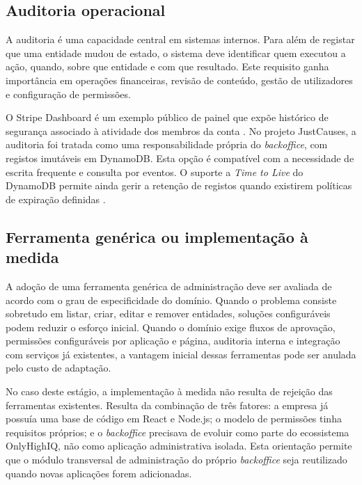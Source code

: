 \subsection{Auditoria operacional}

A auditoria é uma capacidade central em sistemas internos. Para além de registar que uma entidade mudou de estado, o sistema deve identificar quem executou a ação, quando, sobre que entidade e com que resultado. Este requisito ganha importância em operações financeiras, revisão de conteúdo, gestão de utilizadores e configuração de permissões.

O Stripe Dashboard é um exemplo público de painel que expõe histórico de segurança associado à atividade dos membros da conta \cite{StripeTeams}. No projeto JustCauses, a auditoria foi tratada como uma responsabilidade própria do \textit{backoffice}, com registos imutáveis em DynamoDB. Esta opção é compatível com a necessidade de escrita frequente e consulta por eventos. O suporte a \textit{Time to Live} do DynamoDB permite ainda gerir a retenção de registos quando existirem políticas de expiração definidas \cite{DynamoDBTTL}.

\subsection{Ferramenta genérica ou implementação à medida}

A adoção de uma ferramenta genérica de administração deve ser avaliada de acordo com o grau de especificidade do domínio. Quando o problema consiste sobretudo em listar, criar, editar e remover entidades, soluções configuráveis podem reduzir o esforço inicial. Quando o domínio exige fluxos de aprovação, permissões configuráveis por aplicação e página, auditoria interna e integração com serviços já existentes, a vantagem inicial dessas ferramentas pode ser anulada pelo custo de adaptação.

No caso deste estágio, a implementação à medida não resulta de rejeição das ferramentas existentes. Resulta da combinação de três fatores: a empresa já possuía uma base de código em React e Node.js; o modelo de permissões tinha requisitos próprios; e o \textit{backoffice} precisava de evoluir como parte do ecossistema OnlyHighIQ, não como aplicação administrativa isolada. Esta orientação permite que o módulo transversal de administração do próprio \textit{backoffice} seja reutilizado quando novas aplicações forem adicionadas.


